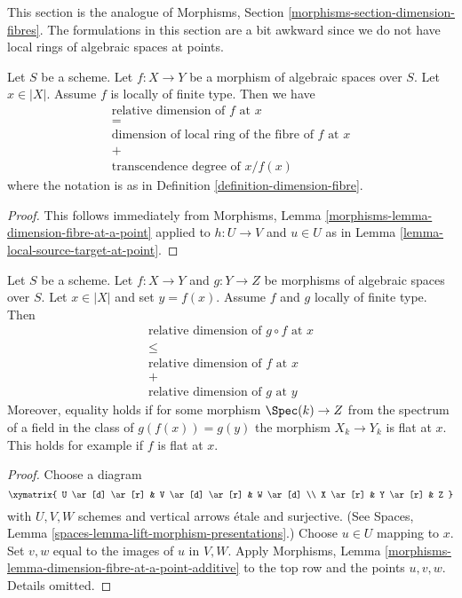 \noindent
This section is the analogue of
Morphisms, Section \ref{morphisms-section-dimension-fibres}.
The formulations in this section are a bit awkward since
we do not have local rings of algebraic spaces at points.

\begin{lemma}
\label{lemma-dimension-fibre-at-a-point}
Let $S$ be a scheme.
Let $f : X \to Y$ be a morphism of algebraic spaces over $S$.
Let $x \in |X|$.
Assume $f$ is locally of finite type.
Then we have
$$
\begin{matrix}
\text{relative dimension of }f\text{ at }x \\
= \\
\text{dimension of local ring of the fibre of }f\text{ at }x \\
+ \\
\text{transcendence degree of }x/f(x)
\end{matrix}
$$
where the notation is as in
Definition \ref{definition-dimension-fibre}.
\end{lemma}

\begin{proof}
This follows immediately from
Morphisms, Lemma \ref{morphisms-lemma-dimension-fibre-at-a-point}
applied to $h : U \to V$ and $u \in U$
as in
Lemma \ref{lemma-local-source-target-at-point}.
\end{proof}

\begin{lemma}
\label{lemma-dimension-fibre-at-a-point-additive}
Let $S$ be a scheme.
Let $f : X \to Y$ and $g : Y \to Z$ be morphisms of algebraic spaces over $S$.
Let $x \in |X|$ and set $y = f(x)$.
Assume $f$ and $g$ locally of finite type.
Then
$$
\begin{matrix}
\text{relative dimension of }g \circ f\text{ at }x \\
\leq \\
\text{relative dimension of }f\text{ at }x \\
+ \\
\text{relative dimension of }g\text{ at }y
\end{matrix}
$$
Moreover, equality holds if for some morphism $\Spec(k) \to Z$
from the spectrum of a field in the class of $g(f(x)) = g(y)$
the morphism $X_k \to Y_k$ is flat at $x$.
This holds for example if $f$ is flat at $x$.
\end{lemma}

\begin{proof}
Choose a diagram
$$
\xymatrix{
U \ar[d] \ar[r] & V \ar[d] \ar[r] & W \ar[d] \\
X \ar[r] & Y \ar[r] & Z
}
$$
with $U, V, W$ schemes and vertical arrows \'etale and surjective. (See
Spaces, Lemma \ref{spaces-lemma-lift-morphism-presentations}.)
Choose $u \in U$ mapping to $x$. Set $v, w$ equal to the images
of $u$ in $V, W$.
Apply
Morphisms, Lemma \ref{morphisms-lemma-dimension-fibre-at-a-point-additive}
to the top row and the points $u, v, w$. Details omitted.
\end{proof}

